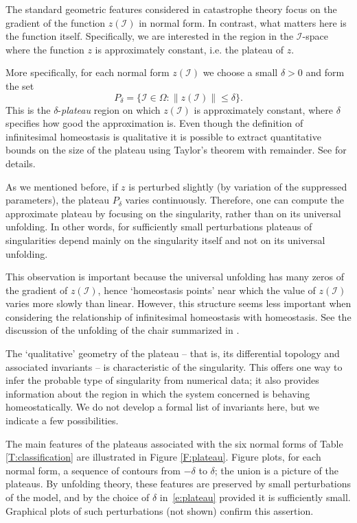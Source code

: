 \documentclass[a4paper,fleqn]{cas-dc}
\newcommand{\II}{{\mathcal I}}
\begin{document}
The standard geometric features considered in catastrophe theory focus on the gradient of the function $z(\II)$ in normal form.
In contrast, what matters here is the function itself. 
Specifically, we are interested in the region in the $\II$-space where the function $z$ is approximately constant, i.e. the plateau of $z$.

More specifically, for each normal form $z(\II)$ we choose a small $\delta>0$ 
and form the set
\begin{equation} \label{e:plateau}
P_\delta = \{\II\in\Omega: \|z(\II)\| \leq \delta\}.
\end{equation}
This is the $\delta$-\emph{plateau} region on which $z(\II)$ is approximately constant, where $\delta$ specifies how good the approximation is.  
Even though the definition of infinitesimal homeostasis is qualitative it is possible to extract quantitative bounds on the size of the plateau using Taylor's theorem with remainder.
See \cite[Chap. 5]{gs2023} for details.

As we mentioned before, if $z$ is perturbed slightly (by variation of the suppressed parameters), the plateau $P_\delta$ varies continuously.
Therefore, one can compute the approximate plateau by focusing on the singularity, rather than on its universal unfolding. 
In other words, for sufficiently small perturbations plateaus of singularities depend mainly on the singularity itself and not on its universal unfolding.

This observation is important because the universal unfolding has many zeros of the gradient of $z(\II)$, hence `homeostasis points' near which the 
value of $z(\II)$ varies more slowly than linear.  
However, this structure seems less important when considering the relationship of infinitesimal 
homeostasis with homeostasis.  
See the discussion of the unfolding of the chair summarized in \cite[Figure~3]{gs2015}.

The `qualitative' geometry of the plateau -- that is, its differential topology and associated invariants -- is characteristic of the singularity. 
This offers one way to infer the probable type of singularity from numerical data; it also provides information about the region in which
the system concerned is behaving homeostatically.  
We do not develop a formal list of invariants here, but we indicate a few possibilities.

The main features of the plateaus associated with the six normal forms of Table \ref{T:classification}
are illustrated in Figure \ref{F:plateau}. 
Figure plots, for each normal form, a sequence of contours from $-\delta$ to $\delta$; the union  is a picture of the plateaus.
By unfolding theory, these features are preserved by small perturbations of the model, and by the choice of $\delta$ in~\eqref{e:plateau} provided it is sufficiently small.
Graphical plots of such perturbations (not shown) confirm this assertion.
\end{document}
